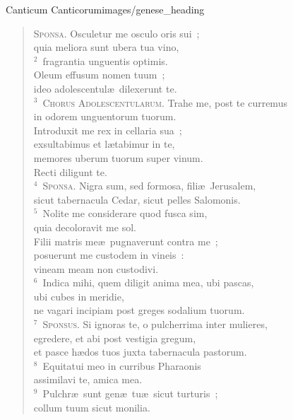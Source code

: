 {Canticum Canticorum}{images/genese_heading}

\begin{flushleft}\begin{verse}\vspace{-11pt}\textsc{Sponsa.} Osculetur me osculo oris sui~;\\ quia meliora sunt ubera tua vino,\\
${}^{2}$~fragrantia unguentis optimis.\\ Oleum effusum nomen tuum~;\\ ideo adolescentul\ae\ dilexerunt te.\\
${}^{3}$~\textsc{Chorus Adolescentularum.} Trahe me, post te curremus\\ in odorem unguentorum tuorum.\\ Introduxit me rex in cellaria sua~;\\ exsultabimus et l\ae tabimur in te,\\ memores uberum tuorum super vinum.\\ Recti diligunt te.\\
${}^{4}$~\textsc{Sponsa.} Nigra sum, sed formosa, fili\ae\ Jerusalem,\\ sicut tabernacula Cedar, sicut pelles Salomonis.\\
${}^{5}$~Nolite me considerare quod fusca sim,\\ quia decoloravit me sol.\\ Filii matris me\ae\ pugnaverunt contra me~;\\ posuerunt me custodem in vineis~:\\ vineam meam non custodivi.\\
${}^{6}$~Indica mihi, quem diligit anima mea, ubi pascas,\\ ubi cubes in meridie,\\ ne vagari incipiam post greges sodalium tuorum.\\
${}^{7}$~\textsc{Sponsus.} Si ignoras te, o pulcherrima inter mulieres,\\ egredere, et abi post vestigia gregum,\\ et pasce h\ae dos tuos juxta tabernacula pastorum.\\
${}^{8}$~Equitatui meo in curribus Pharaonis\\ assimilavi te, amica mea.\\
${}^{9}$~Pulchr\ae\ sunt gen\ae\ tu\ae\ sicut turturis~;\\ collum tuum sicut monilia.\\

\end{verse}
\end{flushleft}
